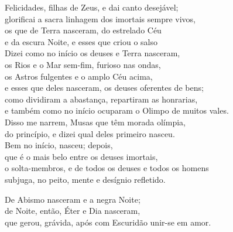 \begin{pages}
\begin{Rightside}
\quad{}Felicidades, filhas de Zeus, e dai canto desejável;\\
glorificai a sacra linhagem dos imortais sempre vivos, \\
os que de Terra nasceram, do estrelado Céu\\
e da escura Noite, e esses que criou o salso \\
Dizei como no início os deuses e Terra nasceram,\\
os Rios e o Mar sem-fim, furioso nas ondas,\\
os Astros fulgentes e o amplo Céu acima, \\
e esses que deles nasceram, os deuses oferentes de bens;\\
como dividiram a abastança, repartiram as honrarias,\\
e também como no início ocuparam o Olimpo de muitos vales.\\
Disso me narrem, Musas que têm morada olímpia,\\
do princípio, e dizei qual deles primeiro nasceu. \\

\quad{}Bem no início,  nasceu; depois,\\
 que é o mais belo entre os deuses imortais,\\
o solta-membros, e de todos os deuses e todos os homens\\
subjuga, no peito, mente e desígnio refletido.\\

\smallskip
\begin{center}\end{center}
\smallskip

De Abismo nasceram  e a negra Noite;\\
de Noite, então, Éter e Dia nasceram,\\
que gerou, grávida, após com Escuridão unir-se em amor.\\


\end{Rightside}
\end{pages}

